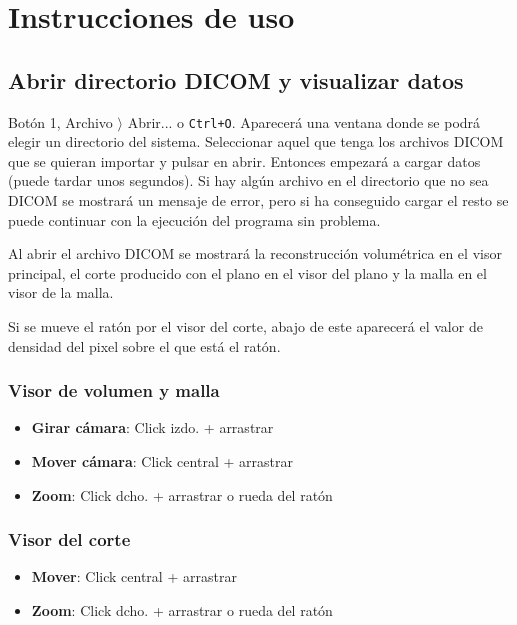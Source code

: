 \section{Instrucciones de uso}

\subsection{Abrir directorio DICOM y visualizar datos}

Botón 1, Archivo $ \rangle $ Abrir... o \texttt{Ctrl+O}. Aparecerá una ventana donde se podrá elegir un directorio del sistema. Seleccionar aquel que tenga los archivos DICOM que se quieran importar y pulsar en abrir. Entonces empezará a cargar datos (puede tardar unos segundos). Si hay algún archivo en el directorio que no sea DICOM se mostrará un mensaje de error, pero si ha conseguido cargar el resto se puede continuar con la ejecución del programa sin problema.

Al abrir el archivo DICOM se mostrará la reconstrucción volumétrica en el visor principal, el corte producido con el plano en el visor del plano y la malla en el visor de la malla.

Si se mueve el ratón por el visor del corte, abajo de este aparecerá el valor de densidad del pixel sobre el que está el ratón.

\subsubsection{Visor de volumen y malla}

\begin{itemize}
	\item \textbf{Girar cámara}: Click izdo. + arrastrar
	\item \textbf{Mover cámara}: Click central + arrastrar
	\item \textbf{Zoom}: Click dcho. + arrastrar o rueda del ratón
\end{itemize}

\subsubsection{Visor del corte}

\begin{itemize}
	\item \textbf{Mover}: Click central + arrastrar
	\item \textbf{Zoom}: Click dcho. + arrastrar o rueda del ratón
\end{itemize}

